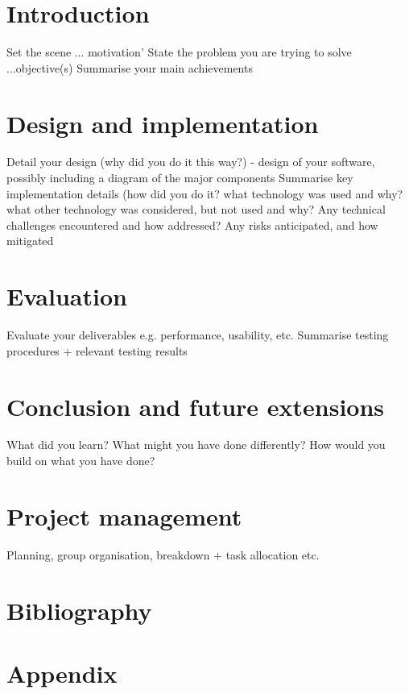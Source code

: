 \documentclass[a4wide, 11pt]{article} \usepackage{a4, fullpage}
\begin{document}
\section{Introduction}

        Set the scene ... motivation'
        State the problem you are trying to solve ...objective(s)
        Summarise your main achievements 

\section{Design and implementation}

        Detail your design (why did you do it this way?) - design of your software, possibly including a diagram of the major components
        Summarise key implementation details (how did you do it? what technology was used and why? what other technology was considered, but not used and why?
        Any technical challenges encountered and how addressed?
        Any risks anticipated, and how mitigated 

\section{Evaluation}

        Evaluate your deliverables e.g. performance, usability, etc.
        Summarise testing procedures + relevant testing results 

\section{Conclusion and future extensions}

        What did you learn? What might you have done differently?
        How would you build on what you have done? 

\section{Project management}

        Planning, group organisation, breakdown + task allocation etc. 

\section{Bibliography}

\section{Appendix}
\end{document}
